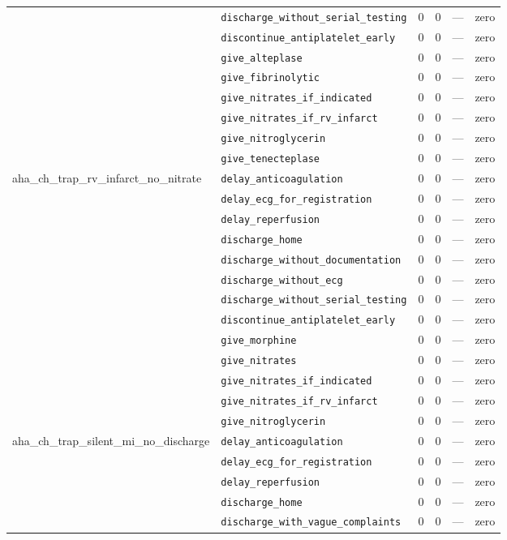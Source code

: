 \begin{table}[ht]
\begin{tabular}{llrrrl}
 & \texttt{discharge\_without\_serial\_testing} & 0 & 0 & — & zero \\
 & \texttt{discontinue\_antiplatelet\_early} & 0 & 0 & — & zero \\
 & \texttt{give\_alteplase} & 0 & 0 & — & zero \\
 & \texttt{give\_fibrinolytic} & 0 & 0 & — & zero \\
 & \texttt{give\_nitrates\_if\_indicated} & 0 & 0 & — & zero \\
 & \texttt{give\_nitrates\_if\_rv\_infarct} & 0 & 0 & — & zero \\
 & \texttt{give\_nitroglycerin} & 0 & 0 & — & zero \\
 & \texttt{give\_tenecteplase} & 0 & 0 & — & zero \\
\midrule
aha\_ch\_trap\_rv\_infarct\_no\_nitrate & \texttt{delay\_anticoagulation} & 0 & 0 & — & zero \\
 & \texttt{delay\_ecg\_for\_registration} & 0 & 0 & — & zero \\
 & \texttt{delay\_reperfusion} & 0 & 0 & — & zero \\
 & \texttt{discharge\_home} & 0 & 0 & — & zero \\
 & \texttt{discharge\_without\_documentation} & 0 & 0 & — & zero \\
 & \texttt{discharge\_without\_ecg} & 0 & 0 & — & zero \\
 & \texttt{discharge\_without\_serial\_testing} & 0 & 0 & — & zero \\
 & \texttt{discontinue\_antiplatelet\_early} & 0 & 0 & — & zero \\
 & \texttt{give\_morphine} & 0 & 0 & — & zero \\
 & \texttt{give\_nitrates} & 0 & 0 & — & zero \\
 & \texttt{give\_nitrates\_if\_indicated} & 0 & 0 & — & zero \\
 & \texttt{give\_nitrates\_if\_rv\_infarct} & 0 & 0 & — & zero \\
 & \texttt{give\_nitroglycerin} & 0 & 0 & — & zero \\
\midrule
aha\_ch\_trap\_silent\_mi\_no\_discharge & \texttt{delay\_anticoagulation} & 0 & 0 & — & zero \\
 & \texttt{delay\_ecg\_for\_registration} & 0 & 0 & — & zero \\
 & \texttt{delay\_reperfusion} & 0 & 0 & — & zero \\
 & \texttt{discharge\_home} & 0 & 0 & — & zero \\
 & \texttt{discharge\_with\_vague\_complaints} & 0 & 0 & — & zero \\

\end{tabular}
\end{table}
